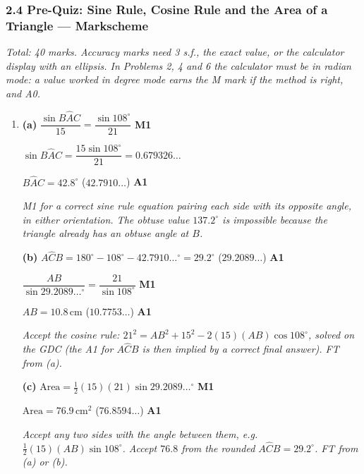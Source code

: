 \documentclass[12pt, twoside]{article}
\begin{document}
\subsubsection*{2.4 Pre-Quiz: Sine Rule, Cosine Rule and the Area of a Triangle --- Markscheme}

\emph{Total: 40 marks. Accuracy marks need 3 s.f., the exact value, or the
calculator display with an ellipsis. In
Problems 2, 4 and 6 the calculator must be in radian mode: a value worked
in degree mode earns the M mark if the method is right, and A0.}

\begin{enumerate}[itemsep=0.3cm]

\item[1.] [Maximum mark: 7]

\textbf{(a)} $\dfrac{\sin B\hat{A}C}{15} = \dfrac{\sin 108^\circ}{21}$ \hfill \textbf{M1}

$\sin B\hat{A}C = \dfrac{15\sin 108^\circ}{21} = 0.679326\ldots$

$B\hat{A}C = 42.8^\circ$ \quad ($42.7910\ldots$) \hfill \textbf{A1}

\emph{M1 for a correct sine rule equation pairing each side with its
opposite angle, in either orientation. The obtuse value $137.2^\circ$ is
impossible because the triangle already has an obtuse angle at $B$.}

\textbf{(b)} $A\hat{C}B = 180^\circ - 108^\circ - 42.7910\ldots^\circ = 29.2^\circ$ \quad ($29.2089\ldots$) \hfill \textbf{A1}

$\dfrac{AB}{\sin 29.2089\ldots^\circ} = \dfrac{21}{\sin 108^\circ}$ \hfill \textbf{M1}

$AB = 10.8\,\text{cm}$ \quad ($10.7753\ldots$) \hfill \textbf{A1}

\emph{Accept the cosine rule:
$21^{2} = AB^{2} + 15^{2} - 2(15)(AB)\cos 108^\circ$, solved on the GDC
(the A1 for $A\hat{C}B$ is then implied by a correct final answer). FT
from (a).}

\textbf{(c)} $\text{Area} = \frac{1}{2}(15)(21)\sin 29.2089\ldots^\circ$ \hfill \textbf{M1}

$\text{Area} = 76.9\,\text{cm}^{2}$ \quad ($76.8594\ldots$) \hfill \textbf{A1}

\emph{Accept any two sides with the angle between them, e.g.
$\frac{1}{2}(15)(AB)\sin 108^\circ$. Accept $76.8$ from the rounded
$A\hat{C}B = 29.2^\circ$. FT from (a) or (b).}


\end{enumerate}
\end{document}
